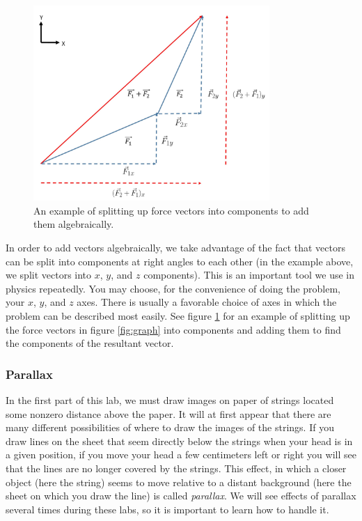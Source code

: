 \begin{figure}[h]
    \begin{center}
        \includegraphics[width=0.8\textwidth, height=0.6\textwidth]{./Exp1-4/pic/image12.jpg}
    \end{center}
    \caption{An example of splitting up force vectors into components to add them algebraically.}
    \label{fig:add}
\end{figure}

In order to add vectors algebraically, we take advantage of the fact that vectors can be split into components at right angles to each other (in the example above, we split vectors into $x$, $y$, and $z$ components). This is an important tool we use in physics repeatedly. You may choose, for the convenience of doing the problem, your $x$, $y$, and $z$ axes. There is usually a favorable choice of axes in which the problem can be described most easily. See figure \ref{fig:add} for an example of splitting up the force vectors in figure \ref{fig:graph} into components and adding them to find the components of the resultant vector.

\subsubsection{Parallax}

In the first part of this lab, we must draw images on paper of strings located some nonzero distance above the paper. It will at first appear that there are many different possibilities of where to draw the images of the strings. If you draw lines on the sheet that seem directly below the strings when your head is in a given position, if you move your head a few centimeters left or right you will see that the lines are no longer covered by the strings. This effect, in which a closer object (here the string) seems to move relative to a distant background (here the sheet on which you draw the line) is called \emph{parallax}. We will see effects of parallax several times during these labs, so it is important to learn how to handle it. \myskip

